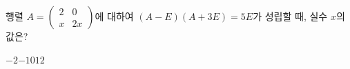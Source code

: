 행렬 $A=\begin{pmatrix} 2 & 0 \\ x & 2x \end{pmatrix}$에 대하여 $(A-E)(A+3E)=5E$가 성립할 때, 실수 $x$의 값은? 
\begin{choices32}{$-2$}{$-1$}{$0$}{$1$}{$2$}\end{choices32}
